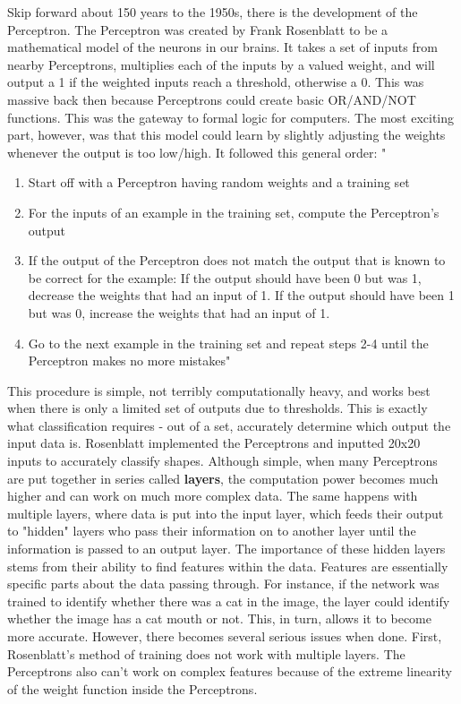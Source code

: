 \documentclass[12pt]{article}
\begin{document}
Skip forward about 150 years to the 1950s, there is the development of the Perceptron. The Perceptron was created by Frank Rosenblatt to be a mathematical model of the neurons in our brains. It takes a set of inputs from nearby Perceptrons, multiplies each of the inputs by a valued weight, and will output a 1 if the weighted inputs reach a threshold, otherwise a 0. This was massive back then because Perceptrons could create basic OR/AND/NOT functions. This was the gateway to formal logic for computers. The most exciting part, however, was that this model could learn by slightly adjusting the weights whenever the output is too low/high. It followed this general order: " 
\begin{enumerate}
\item Start off with a Perceptron having random weights and a training set
\item For the inputs of an example in the training set, compute the Perceptron’s output
\item If the output of the Perceptron does not match the output that is known to be correct for the example: If the output should have been 0 but was 1, decrease the weights that had an input of 1. If the output should have been 1 but was 0, increase the weights that had an input of 1.
\item Go to the next example in the training set and repeat steps 2-4 until the Perceptron makes no more mistakes"
\end{enumerate} \cite{kurenkov}

This procedure is simple, not terribly computationally heavy, and works best when there is only a limited set of outputs due to thresholds. This is exactly what classification requires - out of a set, accurately determine which output the input data is. Rosenblatt implemented the Perceptrons and inputted 20x20 inputs to accurately classify shapes. Although simple, when many Perceptrons are put together in series called \textbf{layers}, the computation power becomes much higher and can work on much more complex data. The same happens with multiple layers, where data is put into the input layer, which feeds their output to "hidden" layers who pass their information on to another layer until the information is passed to an output layer. The importance of these hidden layers stems from their ability to find features within the data. Features are essentially specific parts about the data passing through. For instance, if the network was trained to identify whether there was a cat in the image, the layer could identify whether the image has a cat mouth or not. This, in turn, allows it to become more accurate. However, there becomes several serious issues when done. First, Rosenblatt's method of training does not work with multiple layers. The Perceptrons also can't work on complex features because of the extreme linearity of the weight function inside the Perceptrons. 
\end{document}
